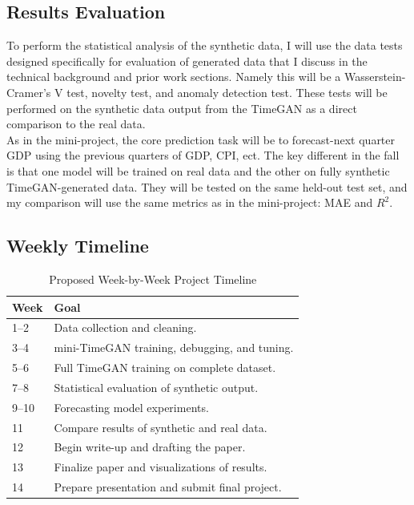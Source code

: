\documentclass[10pt,twocolumn]{article}
\begin{document}
\subsection{Results Evaluation}
To perform the statistical analysis of the synthetic data, I will use the data tests designed specifically for evaluation of generated data that I discuss in the technical background and prior work sections. Namely this will be a Wasserstein-Cramer's V test, novelty test, and anomaly detection test. These tests will be performed on the synthetic data output from the TimeGAN as a direct comparison to the real data.\\
\indent{} As in the mini-project, the core prediction task will be to forecast-next quarter GDP using the previous quarters of GDP, CPI, ect. The key different in the fall is that one model will be trained on real data and the other on fully synthetic TimeGAN-generated data. They will be tested on the same held-out test set, and my comparison will use the same metrics as in the mini-project: MAE and $R^2$.


\subsection{Weekly Timeline}
\begin{table}[h]
\small
\caption{Proposed Week-by-Week Project Timeline}
\begin{tabular}{|p{1.2cm}|p{6.1cm}|}
\hline
\textbf{Week} & \textbf{Goal} \\ \hline
1--2  & Data collection and cleaning. \\
\hline
3--4  & mini-TimeGAN training, debugging, and tuning. \\
\hline
5--6  & Full TimeGAN training on complete dataset. \\
\hline
7--8  & Statistical evaluation of synthetic output. \\
\hline
9--10 & Forecasting model experiments. \\
\hline
11    & Compare results of synthetic and real data. \\
\hline
12    & Begin write-up and drafting the paper. \\
\hline
13    & Finalize paper and visualizations of results. \\
\hline
14    & Prepare presentation and submit final project. \\
\hline
\end{tabular}
\end{table}
\end{document}
